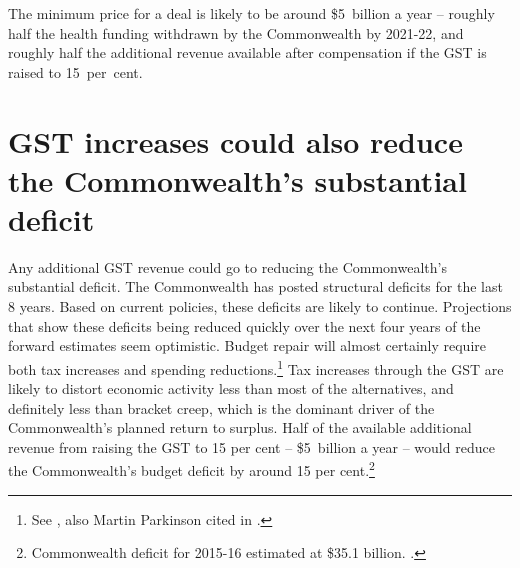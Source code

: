 The minimum price for a deal is likely to be around \$5~billion a year – roughly half the health funding withdrawn by the Commonwealth by 2021-22,  and roughly half the additional revenue available after compensation if the GST is raised to 15~per~cent.

\section{GST increases could also reduce the Commonwealth's substantial deficit}\label{sec:GST-4-2}
Any additional GST revenue could go to reducing the Commonwealth’s substantial deficit. The Commonwealth has posted structural deficits for the last 8 years.  Based on current policies, these deficits are likely to continue. Projections that show these deficits being reduced quickly over the next four years of the forward estimates seem optimistic.  Budget repair will almost certainly require both tax increases and spending reductions.\footnote{See , also Martin Parkinson cited in \textcite{Uren2015-Parkinson-tackle-spending-revenue}.}  Tax increases through the GST are likely to distort economic activity less than most of the alternatives, and definitely less than bracket creep, which is the dominant driver of the Commonwealth’s planned return to surplus.  Half of the available additional revenue from raising the GST to 15 per cent – \$5~billion a year  – would reduce the Commonwealth’s budget deficit by around 15 per cent.\footnote{Commonwealth deficit for 2015-16 estimated at \$35.1 billion. \textcite{Treasury2015FinalBudgetOutcome1415}.} 

